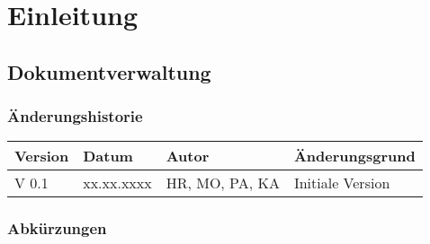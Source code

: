 \documentclass[
11pt,
a4paper,
ngerman,
]{article}
\begin{document}


\tableofcontents
\listoffigures
\listoftables

\newpage


\section{Einleitung}

\subsection{Dokumentverwaltung}

\subsubsection{Änderungshistorie}

\begin{table}[H] %
\begin{tabularx}{\textwidth}{ |X|X|X|X| }
	\hline  %
	\rowcolor[gray]{.8}%
	\rule{0pt}{18pt}%
	\textbf{Version} & \textbf{Datum} & \textbf{Autor} & \textbf{Änderungsgrund} \\
	\hline  %
	V 0.1 & xx.xx.xxxx & HR, MO, PA, KA & Initiale Version \\
	\hline
\end{tabularx}
\end{table}

\subsubsection{Abkürzungen}
\end{document}
